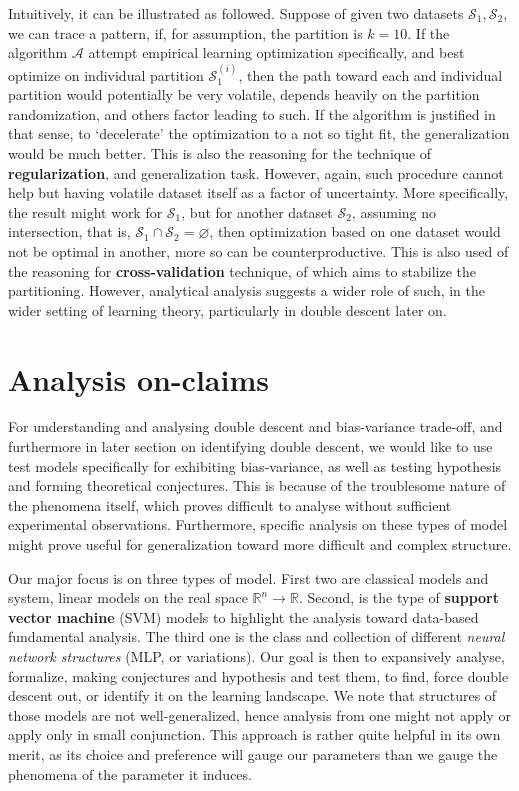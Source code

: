 \documentclass[
  journal=largetwo,
  year=2025,
  volume=37,
]{cup-journal}
\begin{document}
Intuitively, it can be illustrated as followed. Suppose of given two datasets $\mathcal{S}_{1},\mathcal{S}_{2}$, we can trace a pattern, if, for assumption, the partition is $k=10$. If the algorithm $\mathcal{A}$ attempt empirical learning optimization specifically, and best optimize on individual partition $\mathcal{S}_{1}^{(i)}$, then the path toward each and individual partition would potentially be very volatile, depends heavily on the partition randomization, and others factor leading to such. If the algorithm is justified in that sense, to `decelerate' the optimization to a not so tight fit, the generalization would be much better. This is also the reasoning for the technique of \textbf{regularization}, and generalization task. However, again, such procedure cannot help but having volatile dataset itself as a factor of uncertainty. More specifically, the result might work for $\mathcal{S}_{1}$, but for another dataset $\mathcal{S}_{2}$, assuming no intersection, that is, $\mathcal{S}_{1}\cap \mathcal{S}_{2}=\varnothing$, then optimization based on one dataset would not be optimal in another, more so can be counterproductive. This is also used of the reasoning for \textbf{cross-validation} technique, of which aims to stabilize the partitioning. However, analytical analysis suggests a wider role of such, in the wider setting of learning theory, particularly in double descent later on. 

\section{Analysis on-claims}

For understanding and analysing double descent and bias-variance trade-off, and furthermore in later section on identifying double descent, we would like to use test models specifically for exhibiting bias-variance, as well as testing hypothesis and forming theoretical conjectures. This is because of the troublesome nature of the phenomena itself, which proves difficult to analyse without sufficient experimental observations. Furthermore, specific analysis on these types of model might prove useful for generalization toward more difficult and complex structure. 

Our major focus is on three types of model. First two are classical models and system, linear models on the real space $\mathbb{R}^{n}\to\mathbb{R}$. Second, is the type of \textbf{support vector machine} (SVM) models to highlight the analysis toward data-based fundamental analysis. The third one is the class and collection of different \textit{neural network structures} (MLP, or variations). Our goal is then to expansively analyse, formalize, making conjectures and hypothesis and test them, to find, force double descent out, or identify it on the learning landscape. We note that structures of those models are not well-generalized, hence analysis from one might not apply or apply only in small conjunction. This approach is rather quite helpful in its own merit, as its choice and preference will gauge our parameters than we gauge the phenomena of the parameter it induces.
\end{document}
